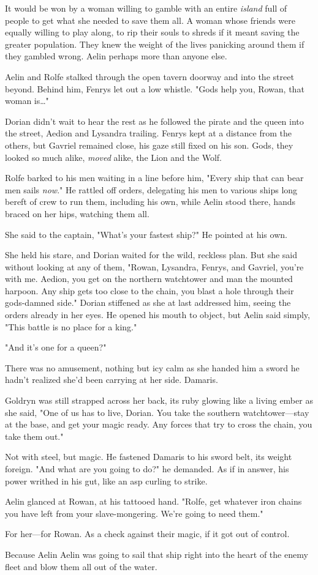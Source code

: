 It would be won by a woman willing to gamble with an entire
\emph{island} full of people to get what she needed to save them all. A woman whose friends were equally willing to play along, to rip their souls to shreds if it meant saving the greater population. They knew the weight of the lives panicking around them if they gambled wrong. Aelin perhaps more than anyone else.

Aelin and Rolfe stalked through the open tavern doorway and into the street beyond. Behind him, Fenrys let out a low whistle. "Gods help you, Rowan, that woman is\ldots"

Dorian didn't wait to hear the rest as he followed the pirate and the queen into the street, Aedion and Lysandra trailing. Fenrys kept at a distance from the others, but Gavriel remained close, his gaze still fixed on his son. Gods, they looked so much alike, \emph{moved} alike, the Lion and the Wolf.

Rolfe barked to his men waiting in a line before him, "Every ship that can bear men sails \emph{now}." He rattled off orders, delegating his men to various ships long bereft of crew to run them, including his own, while Aelin stood there, hands braced on her hips, watching them all.

She said to the captain, "What's your fastest ship?" He pointed at his own.

She held his stare, and Dorian waited for the wild, reckless plan. But she said without looking at any of them, "Rowan, Lysandra, Fenrys, and Gavriel, you're with me. Aedion, you get on the northern watchtower and man the mounted harpoon. Any ship gets too close to the chain, you blast a hole through their gods-damned side." Dorian stiffened as she at last addressed him, seeing the orders already in her eyes. He opened his mouth to object, but Aelin said simply, "This battle is no place for a king."

"And it's one for a queen?"

There was no amusement, nothing but icy calm as she handed him a sword he hadn't realized she'd been carrying at her side. Damaris.

Goldryn was still strapped across her back, its ruby glowing like a living ember as she said, "One of us has to live, Dorian. You take the southern watchtower---stay at the base, and get your magic ready. Any forces that try to cross the chain, you take them out."

Not with steel, but magic. He fastened Damaris to his sword belt, its weight foreign. "And what are you going to do?" he demanded. As if in answer, his power writhed in his gut, like an asp curling to strike.

Aelin glanced at Rowan, at his tattooed hand. "Rolfe, get whatever iron chains you have left from your slave-mongering. We're going to need them."

For her---for Rowan. As a check against their magic, if it got out of control.

Because Aelin  Aelin was going to sail that ship right into the heart of the enemy fleet and blow them all out of the water.
